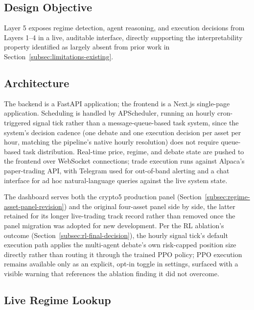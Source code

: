 \subsection{Design Objective}
\label{subsec:dashboard-objective}

Layer 5 exposes regime detection, agent reasoning, and execution decisions from Layers 1--4 in a live, auditable interface, directly supporting the interpretability property identified as largely absent from prior work in Section~\ref{subsec:limitations-existing}.

\subsection{Architecture}
\label{subsec:dashboard-architecture}

The backend is a FastAPI application; the frontend is a Next.js single-page application. Scheduling is handled by APScheduler, running an hourly cron-triggered signal tick rather than a message-queue-based task system, since the system's decision cadence (one debate and one execution decision per asset per hour, matching the pipeline's native hourly resolution) does not require queue-based task distribution. Real-time price, regime, and debate state are pushed to the frontend over WebSocket connections; trade execution runs against Alpaca's paper-trading API, with Telegram used for out-of-band alerting and a chat interface for ad hoc natural-language queries against the live system state.

The dashboard serves both the crypto5 production panel (Section~\ref{subsec:regime-asset-panel-revision}) and the original four-asset panel side by side, the latter retained for its longer live-trading track record rather than removed once the panel migration was adopted for new development. Per the RL ablation's outcome (Section~\ref{subsec:rl-final-decision}), the hourly signal tick's default execution path applies the multi-agent debate's own risk-capped position size directly rather than routing it through the trained PPO policy; PPO execution remains available only as an explicit, opt-in toggle in settings, surfaced with a visible warning that references the ablation finding it did not overcome.

\subsection{Live Regime Lookup}
\label{subsec:dashboard-live-regime}

